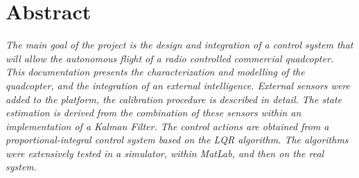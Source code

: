 \documentclass[main]{subfiles}
\begin{document}
\chapter*{Abstract}
\begin{flushright}
\textit{The main goal of the project is the design and integration of a control system that will allow the autonomous flight of a radio controlled commercial quadcopter. This documentation presents the characterization and modelling of the quadcopter, and the integration of an external intelligence. External sensors were added to the platform, the calibration procedure is described in detail. The state estimation is derived from the combination of these sensors within an implementation of a Kalman Filter. The control actions are obtained from a proportional-integral control system based on the LQR algorithm. The algorithms were extensively tested in a simulator, within MatLab, and then on the real system.
}
\end{flushright}
\end{document}
